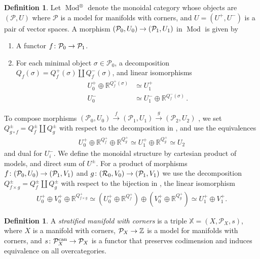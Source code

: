\documentclass[10pt]{amsart}
\numberwithin{equation}{section}
\theoremstyle{definition}
\newtheorem{definition}[prop]{Definition}
\DeclareMathOperator{\Mod}{Mod}
\DeclareMathOperator{\can}{can}
\newcommand{\bZ}{\mathbb{Z}}
\newcommand{\bR}{\mathbb{R}}
\newcommand{\bX}{\mathbb{X}}
\newcommand{\cP}{\mathcal{P}}
\newcommand{\cR}{\mathcal{R}}
\renewcommand{\to}{\mathchoice{\longrightarrow}{\rightarrow}{}{}}
\begin{document}
\begin{definition}
	Let $\Mod^{\otimes}$ denote the monoidal category whose objects are $(\cP,U)$ where $\cP$ is a model for manifolds with corners, and $U=(U^{+},U^{-})$ is a pair of vector spaces.
  A morphism $(\cP_{0},U_{0}) \to (\cP_{1},U_{1})$ in $\Mod$ is given by
	\begin{enumerate}
	    \item 	A functor $f\colon \cP_{0} \to \cP_{1}$.
		\item   For each minimal object $\sigma \in \cP_{0}$, a decomposition $Q_{f}(\sigma) = Q^{+}_{f}(\sigma) \amalg Q^{-}_{f}(\sigma)$, and linear isomorphisms
		\begin{align*}
			U^{+}_{0} \oplus \bR^{Q^{+}_{f}(\sigma)} &\simeq U_{1}^{+} \\
			U^{-}_{0} & \simeq U_{1}^{-}\oplus \bR^{Q^{-}_{f}(\sigma)} \,.
		\end{align*}
	\end{enumerate}
	To compose morphisms $(\cP_{0},U_{0}) \xrightarrow{f} (\cP_{1},U_{1}) \xrightarrow{g} (\cP_{2},U_{2})$ , we set $Q^{\pm}_{g\circ f} = Q^{\pm}_{f} \amalg Q^{\pm}_{g}$ with respect to the decomposition in , and use the equivalences
	\begin{align*}
		U_{0}^{+} \oplus \bR^{Q_{f}^{+}} \oplus \bR^{Q_{g}^{+}} \simeq U_{1}^{+} \oplus \bR^{Q_{g}^{+}} \simeq U_{2}
	\end{align*}
	and dual for $U_{i}^{-}$.
	We define the monoidal structure by cartesian product of models, and direct sum of $U^{\pm}$.
  For a product of morphisms $f\colon (\cP_{0},U_{0}) \to (\cP_{1},V_{1})$ and $g\colon (\cR_{0},V_{0}) \to (\cP_{1},V_{1})$ we use the decomposition  $Q^{\pm}_{f\times g} = Q^{\pm}_{f} \amalg Q^{\pm}_{g}$ with respect to the bijection in , the linear isomorphism
	\begin{align*}
		U_{0}^{+} \oplus V_{0}^{+} \oplus \bR^{Q^{+}_{f\times g}} \simeq (U_{0}^{+} \oplus \bR^{Q_{f}^{+}} ) \oplus (V_{0}^{+}\oplus \bR^{Q_{g}^{+}}) \simeq U_{1}^{+} \oplus V_{1}^{+}.
	\end{align*}
\end{definition}

\begin{definition}\label{def:stratified_manifold_with_corners}
	A \emph{stratified manifold with corners} is a triple $\bX = (X,\cP_X, s)$, where $X$ is a manifold with corners, $\cP_X \to \bZ$ is a model for manifolds with corners, and $s\colon \cP_{X}^{\can} \to \cP_X$ is a functor that preserves codimension and induces equivalence on all overcategories.
\end{definition}
\end{document}
